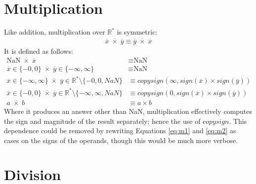 \documentclass[letterpaper,10pt]{article}
\newcommand{\NaN}{\text{NaN}}
\begin{document}
\section{Multiplication}

 Like addition, multiplication over $\mathbb{R}^*$ is symmetric:
\begin{align}
 \overline{x} \;\overline{\times}\; \overline{y} \equiv \overline{y} \;\overline{\times}\; \overline{x}
\end{align}
 It is defined as follows:
\begin{align}
 \NaN \;\overline{\times}\; \overline{x} &\equiv \NaN \\
 \overline{x} \in \{-0, 0\} \;\overline{\times}\; \overline{y} \in \{-\infty, \infty\} &\equiv \NaN \\
 \overline{x} \in \{-\infty, \infty\} \;\overline{\times}\; \overline{y} \in \mathbb{R}^* \setminus \{-0, 0, NaN\} &\equiv copysign(\infty, sign(\overline{x}) \times sign(\overline{y})) \label{eq:m1} \\
 \overline{x} \in \{-0, 0\} \;\overline{\times}\; \overline{y} \in \mathbb{R}^* \setminus \{-\infty, \infty, NaN\} &\equiv copysign(0, sign(\overline{x}) \times sign(\overline{y})) \label{eq:m2} \\
 a \;\overline{\times}\; b &\equiv a \times b
\end{align}
 Where it produces an answer other than NaN, multiplication effectively computes the sign and magnitude of the result separately; hence the use of $copysign$. This dependence could be removed by rewriting Equations \ref{eq:m1} and \ref{eq:m2} as cases on the signs of the operands, though this would be much more verbose.

\section{Division}
\end{document}
